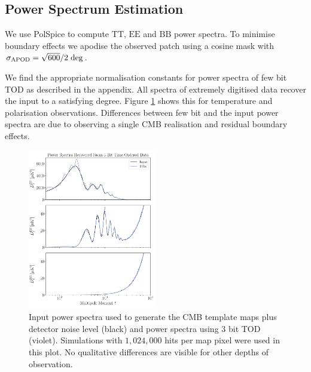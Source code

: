 \documentclass[apj]{emulateapj}
\begin{document}
\subsection{Power Spectrum Estimation}
\label{subsec:psestimation}

We use PolSpice \citep{polspice} to compute $\mathrm{TT}$, $\mathrm{EE}$ and $\mathrm{BB}$ power spectra. To minimise boundary effects we apodise the observed patch using a cosine mask with $\sigma_{\mathrm{APOD}} = \sqrt{600}/2 \hspace{0.7ex} \mathrm{deg}$. %

We find the appropriate normalisation constants for power spectra of few bit TOD as described in the appendix. All spectra of extremely digitised data recover the input to a satisfying degree. Figure \ref{fig:psrecover} shows this for temperature and polarisation observations. Differences between few bit and the input power spectra are due to observing a single CMB realisation and residual boundary effects.


\begin{figure}[htb]\centering
\includegraphics[width=0.5\textwidth,clip]{Plots/psrecovery.pdf}
  \caption[Current ]{
  Input power spectra used to generate the CMB template maps plus detector noise level (black) and power spectra using 3 bit TOD (violet). Simulations with $1,024,000$ hits per map pixel were used in this plot. No qualitative differences are visible for other depths of observation.
\label{fig:psrecover}
}
\end{figure}
\end{document}
